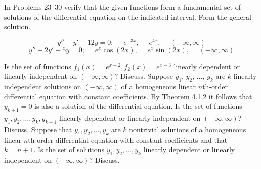 \documentclass[12pt]{report}
\newcommand{\ivpsep}{\mbox{{ }{ }}}
\begin{document}

In Problems 23--30 verify that the given functions form a fundamental set of solutions of the differential equation on the indicated interval. Form the general solution.

\begin{enumerate}[label=\arabic*.,start=23]
     \[ y'' - y' - 12y = 0;\ivpsep e^{-3x},\ivpsep e^{4x},\ivpsep (-\infty, \infty) \]					%
	\setcounter{enumi}{24}
	 \[ y'' - 2y' + 5y = 0;\ivpsep e^{x}\cos(2x), \ivpsep e^{x}\sin(2x),\ivpsep (-\infty, \infty) \]	%
\end{enumerate}

\begin{enumerate}[label=\arabic*.,start=40]
     Is the set of functions $f_{1}(x) = e^{x+2}, f_{2}(x) = e^{x-3}$ linearly dependent or linearly independent on $(-\infty, \infty)$? Discuss. %
	 Suppose $y_{1}$, $y_{2}$, $\dots$, $y_{k}$ are $k$ linearly independent solutions on $(-\infty, \infty)$ of a homogeneous linear $n$th-order differential equation with constant coefficients. By Theorem 4.1.2 it follows that $y_{k+1}=0$ is also a solution of the differential equation. Is the set of functions $y_{1}, y_{2}, \dots, y_{k}, y_{k+1}$ linearly dependent or linearly independent on $(-\infty, \infty)$? Discuss. %
	 Suppose that $y_{1}, y_{2}, \dots, y_{k}$ are $k$ nontrivial solutions of a homogeneous linear $n$th-order differential equation with constant coefficients and that $k=n+1$. Is the set of solutions $y_{1}, y_{2}, \dots, y_{k}$ linearly dependent or linearly independent on $(-\infty, \infty)$? Discuss. %
\end{enumerate}
\end{document}
